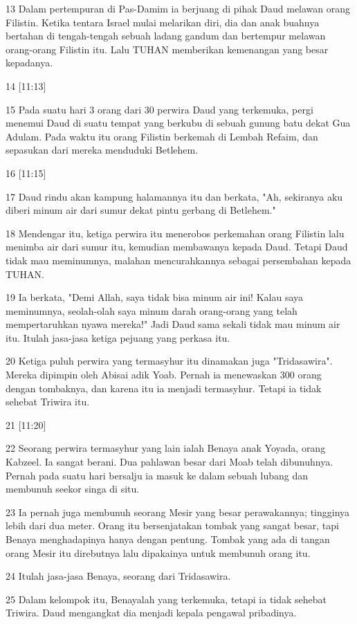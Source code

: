\par 13 Dalam pertempuran di Pas-Damim ia berjuang di pihak Daud melawan orang Filistin. Ketika tentara Israel mulai melarikan diri, dia dan anak buahnya bertahan di tengah-tengah sebuah ladang gandum dan bertempur melawan orang-orang Filistin itu. Lalu TUHAN memberikan kemenangan yang besar kepadanya.
\par 14 [11:13]
\par 15 Pada suatu hari 3 orang dari 30 perwira Daud yang terkemuka, pergi menemui Daud di suatu tempat yang berkubu di sebuah gunung batu dekat Gua Adulam. Pada waktu itu orang Filistin berkemah di Lembah Refaim, dan sepasukan dari mereka menduduki Betlehem.
\par 16 [11:15]
\par 17 Daud rindu akan kampung halamannya itu dan berkata, "Ah, sekiranya aku diberi minum air dari sumur dekat pintu gerbang di Betlehem."
\par 18 Mendengar itu, ketiga perwira itu menerobos perkemahan orang Filistin lalu menimba air dari sumur itu, kemudian membawanya kepada Daud. Tetapi Daud tidak mau meminumnya, malahan mencurahkannya sebagai persembahan kepada TUHAN.
\par 19 Ia berkata, "Demi Allah, saya tidak bisa minum air ini! Kalau saya meminumnya, seolah-olah saya minum darah orang-orang yang telah mempertaruhkan nyawa mereka!" Jadi Daud sama sekali tidak mau minum air itu. Itulah jasa-jasa ketiga pejuang yang perkasa itu.
\par 20 Ketiga puluh perwira yang termasyhur itu dinamakan juga "Tridasawira". Mereka dipimpin oleh Abisai adik Yoab. Pernah ia menewaskan 300 orang dengan tombaknya, dan karena itu ia menjadi termasyhur. Tetapi ia tidak sehebat Triwira itu.
\par 21 [11:20]
\par 22 Seorang perwira termasyhur yang lain ialah Benaya anak Yoyada, orang Kabzeel. Ia sangat berani. Dua pahlawan besar dari Moab telah dibunuhnya. Pernah pada suatu hari bersalju ia masuk ke dalam sebuah lubang dan membunuh seekor singa di situ.
\par 23 Ia pernah juga membunuh seorang Mesir yang besar perawakannya; tingginya lebih dari dua meter. Orang itu bersenjatakan tombak yang sangat besar, tapi Benaya menghadapinya hanya dengan pentung. Tombak yang ada di tangan orang Mesir itu direbutnya lalu dipakainya untuk membunuh orang itu.
\par 24 Itulah jasa-jasa Benaya, seorang dari Tridasawira.
\par 25 Dalam kelompok itu, Benayalah yang terkemuka, tetapi ia tidak sehebat Triwira. Daud mengangkat dia menjadi kepala pengawal pribadinya.
